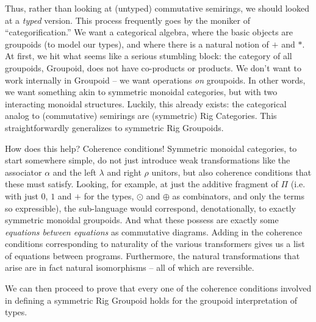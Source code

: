 \documentclass{article}
\begin{document}
Thus, rather than looking at (untyped) commutative semirings,
we should looked at a \emph{typed} version. This process frequently
goes by the moniker of ``categorification.''  We want a categorical
algebra, where the basic objects are groupoids (to model our types),
and where there is a natural notion of $+$ and $*$.  At first,
we hit what seems like a serious stumbling block: the category of
all groupoids, Groupoid, does not have co-products or products.
We don't want to work internally in Groupoid -- we want operations
\emph{on} groupoids. In other words, we want something akin to
symmetric monoidal categories, but with two interacting 
monoidal structures.  Luckily, this already exists: the categorical
analog to (commutative) semirings are (symmetric) Rig Categories.
This straightforwardly generalizes to symmetric Rig Groupoids.

How does this help? Coherence conditions! Symmetric monoidal categories,
to start somewhere simple, do not just introduce weak transformations
like the associator $\alpha$ and the left $\lambda$ and right $\rho$
unitors, but also coherence conditions that these must satisfy. Looking,
for example, at just the additive fragment of $\Pi$ (i.e. with just $0$,
$1$ and $+$ for the types, $\odot$ and $\oplus$ as combinators, and
only the terms so expressible), the sub-language would correspond,
denotationally, to exactly symmetric monoidal groupoids. And what
these possess are exactly some \emph{equations between equations}
as commutative diagrams.  Adding in the coherence conditions 
corresponding to naturality of the various transformers gives us a
list of equations between programs.  Furthermore, the natural transformations
that arise are in fact natural isomorphisms -- all of which are
reversible.

We can then proceed to prove that every one of the coherence conditions
involved in defining a symmetric Rig Groupoid holds for the groupoid
interpretation of types.
\end{document}
